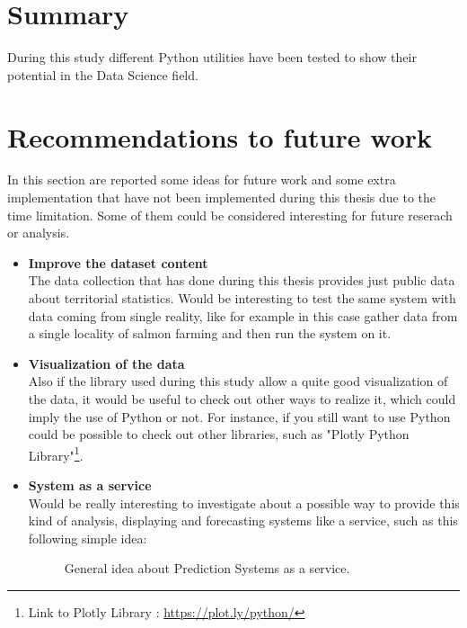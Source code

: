 
\section{Summary}
During this study different Python utilities have been tested to show their potential in the Data Science field. 
\newpage
\section{Recommendations to future work}
\vspace{-5mm}
In this section are reported some ideas for future work and some extra implementation that have not been implemented during this thesis due to the time limitation. Some of them could be considered interesting for future reserach or analysis.
\begin{itemize}
\item \textbf{Improve the dataset content}\\ The data collection that has done during this thesis provides just public data about territorial statistics. Would be interesting to test the same system with data coming from single reality, like for example in this case gather data from a single locality of salmon farming and then run the system on it.
\item \textbf{Visualization of the data}\\ Also if the library used during this study allow a quite good visualization of the data, it would be useful to check out other ways to realize it, which could imply the use of Python or not. For instance, if you still want to use Python could be possible to check out other libraries, such as "Plotly Python Library"\footnote{Link to Plotly Library : \url{https://plot.ly/python/}}.
\item \textbf{System as a service}\\ Would be really interesting to investigate about a possible way to provide this kind of analysis, displaying and forecasting systems like a service, such as this following simple idea:\\

\begin{figure}[H]
	\centering
    \caption{General idea about Prediction Systems as a service.}
\end{figure}


\end{itemize}
